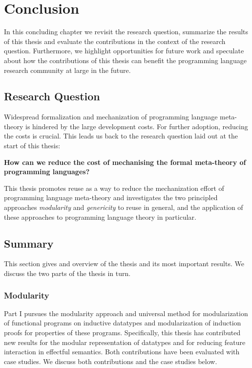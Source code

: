 \chapter{Conclusion}

In this concluding chapter we revisit the research question, summarize the
results of this thesis and evaluate the contributions in the context of the
research question. Furthermore, we highlight opportunities for future work and
speculate about how the contributions of this thesis can benefit the programming
language research community at large in the future.

\section{Research Question}
Widespread formalization and mechanization of programming language meta-theory
is hindered by the large development costs. For further adoption, reducing the
costs is crucial. This leads us back to the research question laid out at the
start of this thesis:

\begin{center}
  \begin{minipage}{0.8\columnwidth}\bf
    How can we reduce the cost of mechanising the formal meta-theory of
    programming languages?
  \end{minipage}
\end{center}

This thesis promotes reuse as a way to reduce the mechanization effort of
programming language meta-theory and investigates the two principled approaches
\emph{modularity} and \emph{genericity} to reuse in general, and the application
of these approaches to programming language theory in particular.

\section{Summary}

This section gives and overview of the thesis and its most important results. We
discuss the two parts of the thesis in turn.

\subsection{Modularity}
Part I pursues the modularity approach and universal method for modularization
of functional programs on inductive datatypes and modularization of induction
proofs for properties of these programs. Specifically, this thesis has
contributed new results for the modular representation of datatypes and for
reducing feature interaction in effectful semantics. Both contributions have
been evaluated with case studies. We discuss both contributions and the case
studies below.


